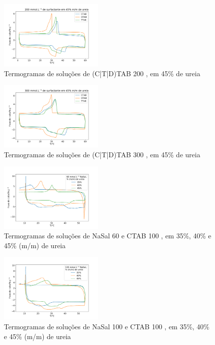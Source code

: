 		\begin{figure}[h]
			\centering
			\includegraphics[width=0.45\textwidth]{./imagens/dsc/Surf_200mm_45p}
			\caption{Termogramas de soluções de (C|T|D)TAB 200 \mM{}, em 45\% de ureia}
			\label{fig:DSC_Surf_200mm_45p}
		\end{figure}
	
		\begin{figure}[h]
			\centering
			\includegraphics[width=0.45\textwidth]{./imagens/dsc/Surf_300mm_45p}
			\caption{Termogramas de soluções de (C|T|D)TAB 300 \mM{}, em 45\% de ureia}
			\label{fig:DSC_Surf_300mm_45p}
		\end{figure}
	
		\begin{figure}[h]
			\centering
			\includegraphics[width=0.45\textwidth]{./imagens/dsc/NaSal60}
			\caption{Termogramas de soluções de NaSal 60\mM{} e CTAB 100 \mM{}, em 35\%, 40\% e 45\% (m/m) de ureia}
			\label{fig:DSC_NaSal60}
		\end{figure}
	
		\begin{figure}[h]
			\centering
			\includegraphics[width=0.45\textwidth]{./imagens/dsc/NaSal100}
			\caption{Termogramas de soluções de NaSal 100\mM{} e CTAB 100 \mM{}, em 35\%, 40\% e 45\% (m/m) de ureia}
			\label{fig:DSC_NaSal100}
		\end{figure}

